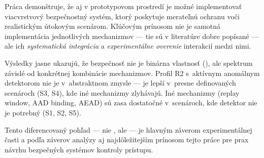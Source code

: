 Práca demonštruje, že aj v prototypovom prostredí je možné implementovať viacvrstvový bezpečnostný systém, ktorý poskytuje merateľnú ochranu voči realistickým útokovým scenárom. Kľúčovým prínosom nie je samotná implementácia jednotlivých mechanizmov --- tie sú v literatúre dobre popísané --- ale ich \emph{systematická integrácia} a \emph{experimentálne overenie} interakcií medzi nimi.

Výsledky jasne ukazujú, že bezpečnosť nie je binárna vlastnosť (), ale spektrum závislé od konkrétnej kombinácie mechanizmov. Profil R2 s~aktívnym anomálnym detektorom nie je  v~abstraktnom zmysle --- je lepší v~presne definovaných scenároch (S3, S4), kde iné mechanizmy zlyhávajú. Iné mechanizmy (replay window, AAD binding, AEAD) sú zasa dostatočné v~scenároch, kde detektor nie je potrebný (S1, S2, S5).

Tento diferencovaný pohľad --- nie , ale  --- je hlavným záverom experimentálnej časti a podľa záverov analýzy aj najdôležitejším prínosom tejto práce pre prax návrhu bezpečných systémov kontroly prístupu.
